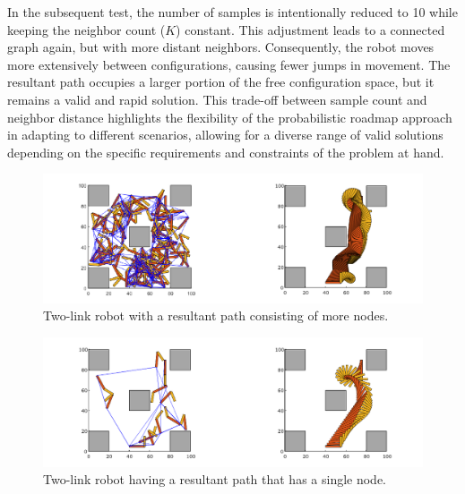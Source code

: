 \documentclass{IEEEtaes}
\begin{document}
In the subsequent test, the number of samples is intentionally reduced to 10 while keeping the neighbor count ($K$) constant. This adjustment leads to a connected graph again, but with more distant neighbors. Consequently, the robot moves more extensively between configurations, causing fewer jumps in movement. The resultant path occupies a larger portion of the free configuration space, but it remains a valid and rapid solution. This trade-off between sample count and neighbor distance highlights the flexibility of the probabilistic roadmap approach in adapting to different scenarios, allowing for a diverse range of valid solutions depending on the specific requirements and constraints of the problem at hand.
\begin{figure}[t]
    \begin{center}
        \includegraphics[width=1\linewidth]{figures/EXP2-1.pdf}
     \end{center}
     \vspace{-1em}
     \caption{Two-link robot with a resultant path consisting of more nodes.}
     \label{two-link-1}
     \vspace{-1em}
\end{figure}

\begin{figure}[t]
    \begin{center}
        \includegraphics[width=1\linewidth]{figures/EXP2-2.pdf}
     \end{center}
     \vspace{-1em}
     \caption{Two-link robot having a resultant path that has a single node.}
     \label{two-link-2}
     \vspace{-1em}
\end{figure}
\end{document}
